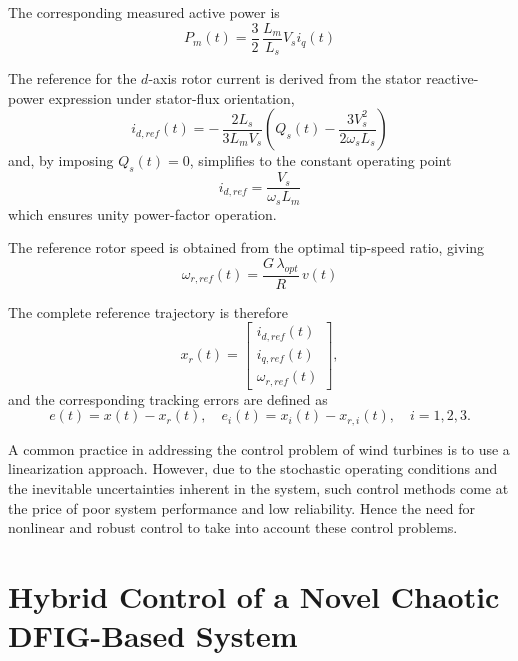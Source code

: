 \documentclass[conference]{IEEEtran}
\begin{document}
The corresponding measured active power is
\begin{equation}
P_{m}(t) = \frac{3}{2}\,\frac{L_{m}}{L_{s}}V_{s}i_{q}(t)
\label{eq14}
\end{equation}

The reference for the $d$-axis rotor current is derived from the stator reactive-power expression under stator-flux orientation,
\begin{equation}
i_{d,ref}(t) = - \,\frac{2L_{s}}{3L_{m}V_{s}}\left( Q_{s}(t) - \frac{3V_{s}^{2}}{2\omega_{s}L_{s}} \right)
\label{eq15}
\end{equation}
and, by imposing $Q_{s}(t) = 0$, simplifies to the constant operating point
\begin{equation}
i_{d,ref} = \frac{V_{s}}{\omega_{s}L_{m}}
\label{eq16}
\end{equation}
which ensures unity power-factor operation.

The reference rotor speed is obtained from the optimal tip-speed ratio, giving
\begin{equation}
\omega_{r,ref}(t) = \frac{G\,\lambda_{opt}}{R}\, v(t)
\label{eq17}
\end{equation}

The complete reference trajectory is therefore
\begin{equation*}
x_{r}(t) = \begin{bmatrix}
i_{d,ref}(t) \\
i_{q,ref}(t) \\
\omega_{r,ref}(t)
\end{bmatrix},
\end{equation*}
and the corresponding tracking errors are defined as
\begin{equation*}
e(t) = x(t) - x_{r}(t),\quad e_{i}(t) = x_{i}(t) - x_{r,i}(t),\quad i = 1,2,3.
\end{equation*}

A common practice in addressing the control problem of wind turbines is to use a linearization approach. However, due to the stochastic operating conditions and the inevitable uncertainties inherent in the system, such control methods come at the price of poor system performance and low reliability. Hence the need for nonlinear and robust control to take into account these control problems.

\section{Hybrid Control of a Novel Chaotic DFIG-Based System}
\end{document}
